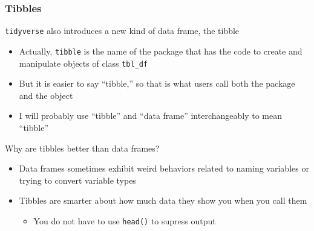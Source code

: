 \documentclass{beamer}\usepackage[]{graphicx}\usepackage[]{color}
\begin{document}
\begin{frame}\frametitle{Tibbles}
    \texttt{tidyverse} also introduces a new kind of data frame, the tibble
    \begin{itemize}
        \item Actually, \texttt{tibble} is the name of the package that has the code to create and manipulate objects of class \texttt{tbl\_df}
        \item But it is easier to say ``tibble,'' so that is what users call both the package and the object
        \item I will probably use ``tibble'' and  ``data frame'' interchangeably to mean ``tibble''
    \end{itemize}
    \vspace{2ex}
    Why are tibbles better than data frames?
    \begin{itemize}
        \item Data frames sometimes exhibit weird behaviors related to naming variables or trying to convert variable types
        \item Tibbles are smarter about how much data they show you when you call them
        \begin{itemize}
            \item You do not have to use \texttt{head()} to supress output
        \end{itemize}
    \end{itemize}
\end{frame}
\end{document}
